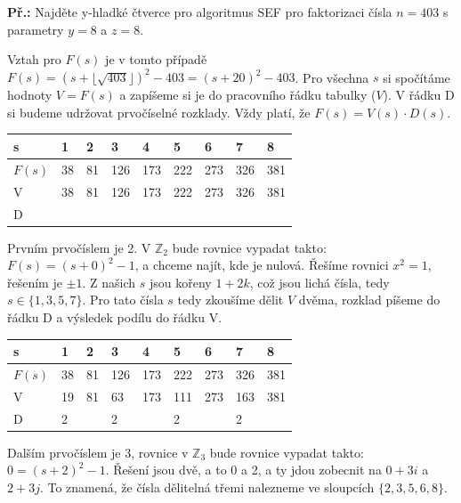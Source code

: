\begin{exercise}
\textbf{Př.:} Najděte y-hladké čtverce pro algoritmus SEF pro faktorizaci čísla
$n=403$ s parametry $y = 8$ a $z=8$.

Vztah pro $F(s)$ je v tomto případě $F(s) = (s +\lfloor \sqrt{403} \rfloor)^2 -
403= (s + 20)^2 - 403$. Pro všechna $s$ si spočítáme hodnoty $V = F(s)$ a
zapíšeme si je do pracovního řádku tabulky ($V$). V řádku D si budeme udržovat
prvočíselné rozklady. Vždy platí, že $F(s) = V(s) \cdot D(s)$.

\begin{center}
\begin{tabular}{|p{1cm}|p{1cm}|p{1cm}|p{1cm}|p{1cm}|p{1cm}|p{1cm}|p{1cm}|p{1cm}|}
\hline
s & 1 & 2 &3 & 4 & 5 & 6 & 7 & 8\\
\hline
\hline
$F(s)$ & 38 & 81 & 126 & 173 & 222 & 273 & 326 & 381\\
\hline
V & 38 & 81 & 126 & 173 & 222 & 273 & 326 & 381\\
\hline
D &  &   &  &   &   &  &   &  \\
\hline
\end{tabular}
\end{center}

Prvním prvočíslem je 2. V $\mathbb{Z}_2$ bude rovnice vypadat takto: $F(s) = (s
+ 0)^2 - 1$, a chceme najít, kde je nulová. Řešíme rovnici $x^2 = 1$, řešením je
$\pm1$. Z našich $s$ jsou kořeny $1 + 2k$, což jsou lichá čísla, tedy $s \in \{1, 3, 5, 7\}$. Pro tato čísla $s$
tedy zkoušíme dělit $V$ dvěma, rozklad píšeme do řádku D a výsledek podílu do řádku
V.

\begin{center}
\begin{tabular}{|p{1cm}|p{1cm}|p{1cm}|p{1cm}|p{1cm}|p{1cm}|p{1cm}|p{1cm}|p{1cm}|}
\hline
s & \textbf{1} & 2 &\textbf{3} & 4 & \textbf{5} & 6 & \textbf{7} & 8\\
\hline
\hline
$F(s)$ & 38 & 81 & 126 & 173 & 222 & 273 & 326 & 381\\
\hline
V & 19 & 81 & 63 & 173 & 111 & 273 & 163 & 381\\
\hline
D & 2  &       & 2   &         & 2     &         &  2    &  \\
\hline
\end{tabular}
\end{center}

Dalším prvočíslem je 3, rovnice v $\mathbb{Z}_3$ bude rovnice vypadat takto: $0
= (s + 2)^2 - 1$. Řešení jsou dvě, a to 0 a 2, a ty jdou zobecnit na $0 + 3i$ a
$2 + 3j$.  To znamená, že čísla dělitelná třemi nalezneme ve sloupcích $\{2, 3,
5, 6, 8\}$.


\end{exercise}
